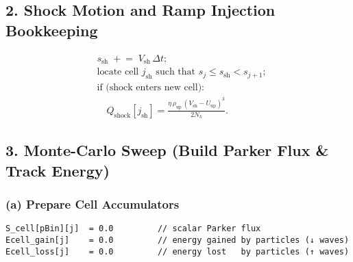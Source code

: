 \subsection*{2. Shock Motion and Ramp Injection Bookkeeping}

\[
\begin{aligned}
& s_{\text{sh}} \; \mathrel{+}= \; V_{\text{sh}} \, \Delta t; \\
& \text{locate cell } j_{\text{sh}} \text{ such that } s_j \leq s_{\text{sh}} < s_{j+1}; \\
& \text{if (shock enters new cell):} \\
& \quad Q_{\text{shock}}[j_{\text{sh}}] = \frac{ \eta \, \rho_{\text{up}} \, (V_{\text{sh}} - U_{\text{up}})^3 }{ 2 N_k }.
\end{aligned}
\]


\subsection*{3. Monte-Carlo Sweep (Build Parker Flux \& Track Energy)}

\subsubsection*{(a) Prepare Cell Accumulators}
\begin{verbatim}
S_cell[pBin][j]  = 0.0         // scalar Parker flux
Ecell_gain[j]    = 0.0         // energy gained by particles (↓ waves)
Ecell_loss[j]    = 0.0         // energy lost   by particles (↑ waves)
\end{verbatim}

